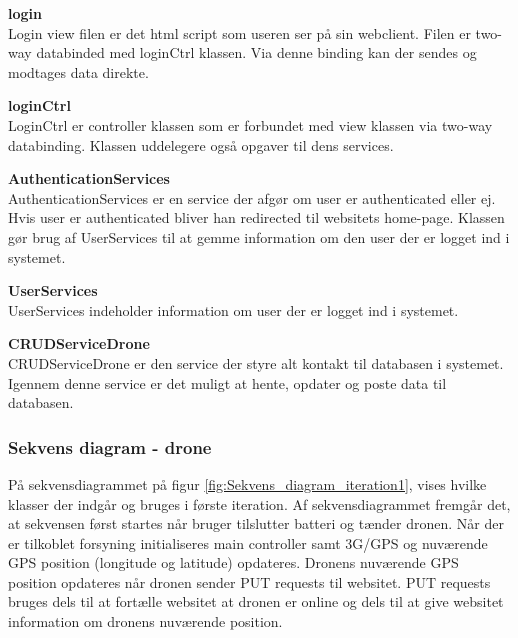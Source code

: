 \vspace{-0.2cm}

\textbf{login} \\
Login view filen er det html script som useren ser på sin webclient. Filen er two-way databinded med loginCtrl klassen. Via denne binding kan der sendes og modtages data direkte.

\textbf{loginCtrl} \\
LoginCtrl er controller klassen som er forbundet med view klassen via two-way databinding. Klassen uddelegere også opgaver til dens services.

\textbf{AuthenticationServices} \\
AuthenticationServices er en service der afgør om user er authenticated eller ej. Hvis user er authenticated bliver han redirected til websitets home-page. Klassen gør brug af UserServices til at gemme information om den user der er logget ind i systemet.

\textbf{UserServices}\\
UserServices indeholder information om user der er logget ind i systemet.

\textbf{CRUDServiceDrone} \\
CRUDServiceDrone er den service der styre alt kontakt til databasen i systemet. Igennem denne service er det muligt at hente, opdater og poste data til databasen.



\newpage
\subsubsection*{Sekvens diagram - drone}
På sekvensdiagrammet på figur \ref{fig:Sekvens_diagram_iteration1}, vises hvilke klasser der indgår og bruges i første iteration. Af sekvensdiagrammet fremgår det, at sekvensen først startes når bruger tilslutter batteri og tænder dronen. Når der er tilkoblet forsyning initialiseres main controller samt 3G/GPS og nuværende GPS position  (longitude og latitude) opdateres. Dronens nuværende GPS position opdateres når dronen sender PUT requests til websitet. PUT requests bruges dels til at fortælle websitet at dronen er online og dels til at give websitet information om dronens nuværende position. 


